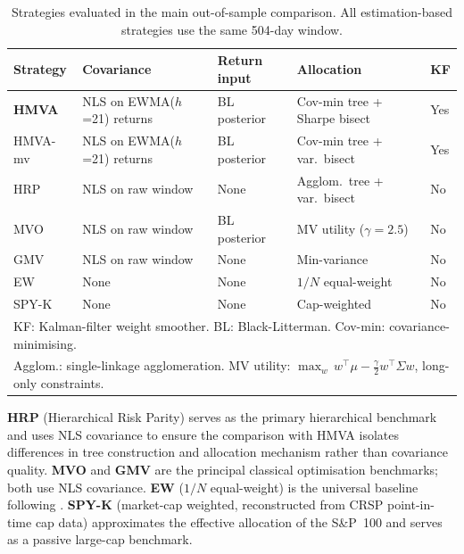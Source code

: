 \documentclass[a4paper,12pt]{report}
\begin{document}
\begin{table}[H]
  \centering
  \caption{Strategies evaluated in the main out-of-sample comparison.
           All estimation-based strategies use the same 504-day window.}
  \label{tab:strategies}
  \begin{tabular}{@{}p{1.8cm}p{2.8cm}p{2.4cm}p{2.6cm}p{1.2cm}@{}}
    \toprule
    Strategy & Covariance & Return input & Allocation & KF \\
    \midrule
    \textbf{HMVA}
      & NLS on EWMA($h$=21) returns
      & BL posterior
      & Cov-min tree + Sharpe bisect
      & Yes \\[3pt]
    HMVA-mv
      & NLS on EWMA($h$=21) returns
      & BL posterior
      & Cov-min tree + var.\ bisect
      & Yes \\[3pt]
    HRP
      & NLS on raw window
      & None
      & Agglom.\ tree + var.\ bisect
      & No \\[3pt]
    MVO
      & NLS on raw window
      & BL posterior
      & MV utility ($\gamma=2.5$)
      & No \\[3pt]
    GMV
      & NLS on raw window
      & None
      & Min-variance
      & No \\[3pt]
    EW
      & None
      & None
      & $1/N$ equal-weight
      & No \\[3pt]
    SPY-K
      & None
      & None
      & Cap-weighted
      & No \\
    \bottomrule
    \multicolumn{5}{l}{\small KF: Kalman-filter weight smoother. BL: Black-Litterman.
      Cov-min: covariance-minimising.} \\
    \multicolumn{5}{l}{\small Agglom.: single-linkage agglomeration.
      MV utility: $\max_w\, w^\top\mu - \tfrac{\gamma}{2}w^\top\Sigma w$,
      long-only constraints.} \\
  \end{tabular}
\end{table}

\textbf{HRP} (Hierarchical Risk Parity) serves as the primary hierarchical
benchmark and uses NLS covariance to ensure the comparison with HMVA isolates
differences in tree construction and allocation mechanism rather than
covariance quality. \textbf{MVO} and \textbf{GMV} are the principal
classical optimisation benchmarks; both use NLS covariance. \textbf{EW}
($1/N$ equal-weight) is the universal baseline following \citet{demiguel2009}.
\textbf{SPY-K} (market-cap weighted, reconstructed from CRSP point-in-time
cap data) approximates the effective allocation of the S\&P~100 and serves as
a passive large-cap benchmark.
\end{document}
